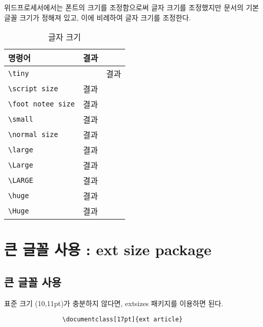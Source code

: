 \documentclass[12pt,a4paper]{book}
\begin{document}
	
		위드프로세서에서는 폰트의 크기를 조정함으로써 글자 크기를 조정했지만 
		문서의 기본 글꼴 크기가 정해져 있고, 이에 비례하여 글자 크기를 조정한다.
		
		
			\begin{table}[hbp]
			\caption{글자 크기}
			\centering
			\begin{tabular}{l  l  l }
			\toprule
			명령어 & 결과 \\
			\toprule
			\verb|\tiny|				&  &\normalsize{결과}\\
			\verb||		& \scriptsize{결과} \\
			\verb|\foot notee size| 	& \footnotesize{결과} \\
			\verb|\small|			& \small{결과} \\
			\verb|| 		& \normalsize{결과} \\
			\verb|\large| 			& \large{결과} \\
			\verb|\Large| 			& \Large{결과} \\
			\verb|\LARGE| 			& \LARGE{결과} \\
			\verb|\huge| 			& \huge{결과} \\
			\verb|\Huge| 			& \Huge{결과} \\
			\bottomrule
			\end{tabular}%
			\end{table}%
			
			
			
			
		
				
	\clearpage
	\section{큰 글꼴 사용 : ext size package }
	\null
	
		\subsection*{큰 글꼴 사용}
	
			표준 크기 (10,11pt)가 충분하지 않다면, extsizes 패키지를 이용하면 된다.\\
			
			\begin{boxedminipage}[c]{1.0\linewidth}
			\begin{verbatim}
				\documentclass[17pt]{ext article}
			\end{verbatim}
			\end{boxedminipage}
			
\end{document}

